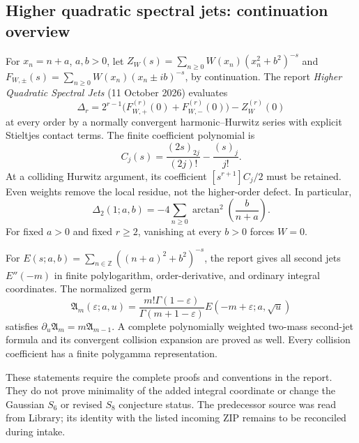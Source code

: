 \subsection{Higher quadratic spectral jets: continuation overview}
\label{hqj:integration:overview}
For $x_n=n+a$, $a,b>0$, let $Z_W(s)=\sum_{n\ge0}W(x_n)(x_n^2+b^2)^{-s}$
and $F_{W,\pm}(s)=\sum_{n\ge0}W(x_n)(x_n\pm ib)^{-s}$, by continuation.
The report \emph{Higher Quadratic Spectral Jets} (11 October 2026) evaluates
\[
\Delta_r=2^{r-1}\bigl(F_{W,+}^{(r)}(0)+F_{W,-}^{(r)}(0)\bigr)-Z_W^{(r)}(0)
\]
at every order by a normally convergent harmonic--Hurwitz series with
explicit Stieltjes contact terms. The finite coefficient polynomial is
\[
C_j(s)=\frac{(2s)_{2j}}{(2j)!}-\frac{(s)_j}{j!}.
\]
At a colliding Hurwitz argument, its coefficient $[s^{r+1}]C_j/2$ must
be retained. Even weights remove the local residue, not the higher-order
defect. In particular,
\[
\Delta_2(1;a,b)=-4\sum_{n\ge0}\arctan^2\!\left(\frac{b}{n+a}\right).
\]
For fixed $a>0$ and fixed $r\ge2$, vanishing at every $b>0$ forces $W=0$.

For $E(s;a,b)=\sum_{n\in\mathbb Z}((n+a)^2+b^2)^{-s}$, the report gives
all second jets $E''(-m)$ in finite polylogarithm, order-derivative, and
ordinary integral coordinates. The normalized germ
\[
\mathfrak A_m(\varepsilon;a,u)=
\frac{m!\Gamma(1-\varepsilon)}{\Gamma(m+1-\varepsilon)}
E(-m+\varepsilon;a,\sqrt u)
\]
satisfies $\partial_u\mathfrak A_m=m\mathfrak A_{m-1}$.
A complete polynomially weighted two-mass second-jet formula and its
convergent collision expansion are proved as well. Every collision
coefficient has a finite polygamma representation.

These statements require the complete proofs and conventions in the report.
They do not prove minimality of the added integral coordinate or change the
Gaussian $S_6$ or revised $S_8$ conjecture status. The predecessor source
was read from Library; its identity with the listed incoming ZIP remains
to be reconciled during intake.
